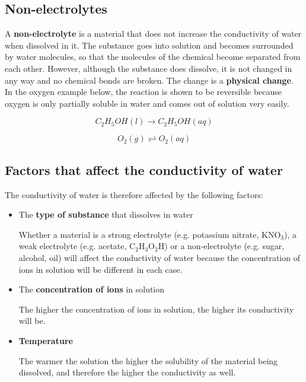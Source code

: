 \subsection{Non-electrolytes}

A \textbf{non-electrolyte} is a material that does not increase the conductivity of water when dissolved in it. The substance goes into solution and becomes surrounded by water molecules, so that the molecules of the chemical become separated from each other. However, although the substance does dissolve, it is not changed in any way and no chemical bonds are broken. The change is a \textbf{physical change}. In the oxygen example below, the reaction is shown to be reversible because oxygen is only partially soluble in water and comes out of solution very easily.

\begin{equation*}
C_{2}H_{5}OH (l) \rightarrow C_{2}H_{5}OH (aq)
\end{equation*} 

\begin{equation*}
O_{2} (g) \rightleftharpoons O_{2} (aq)
\end{equation*}

\subsection{Factors that affect the conductivity of water}

The conductivity of water is therefore affected by the following factors:

\begin{itemize}

\item{The \textbf{type of substance} that dissolves in water  

Whether a material is a strong electrolyte (e.g. potassium nitrate, KNO$_{3}$), a weak electrolyte (e.g. acetate, C$_{2}$H$_{3}$O$_{2}$H) or a non-electrolyte (e.g. sugar, alcohol, oil) will affect the conductivity of water because the concentration of ions in solution will be different in each case.


}

\item{The \textbf{concentration of ions} in solution 

The higher the concentration of ions in solution, the higher its conductivity will be.
}

\item{\textbf{Temperature} 

The warmer the solution the higher the solubility of the material being dissolved, and therefore the higher the conductivity as well.
}
\end{itemize}

